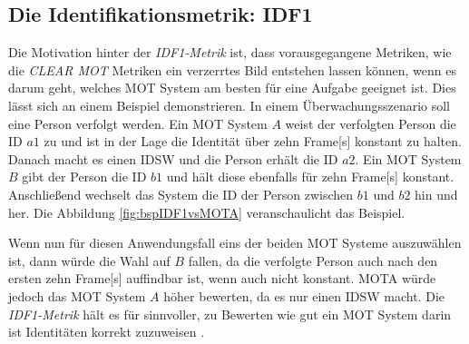 \subsection{Die Identifikationsmetrik: IDF1} \label{sec:MOT F1}
Die Motivation hinter der \textit{\gls{IDF1}-Metrik} ist, dass vorausgegangene Metriken, wie die \textit{\acrshort{CLEAR} \gls{MOT}} Metriken ein verzerrtes Bild entstehen lassen können, wenn es darum geht, welches \gls{MOT} System am besten für eine Aufgabe geeignet ist. Dies lässt sich an einem Beispiel demonstrieren. In einem Überwachungsszenario soll eine Person verfolgt werden. Ein \gls{MOT} System \(A\) weist der verfolgten Person die \acrshort{ID} \(a1\) zu und ist in der Lage die Identität über zehn \gls{Frame}[s] konstant zu halten. Danach macht es einen \gls{IDSW} und die Person erhält die \acrshort{ID} \(a2\). Ein \gls{MOT} System \(B\) gibt der Person die \acrshort{ID} \(b1\) und hält diese ebenfalls für zehn \gls{Frame}[s] konstant. Anschließend wechselt das System die \acrshort{ID} der Person zwischen \(b1\) und \(b2\) hin und her. Die Abbildung \ref{fig:bspIDF1vsMOTA} veranschaulicht das Beispiel.


Wenn nun für diesen Anwendungsfall eins der beiden \gls{MOT} Systeme auszuwählen ist, dann würde die Wahl auf \(B\) fallen, da die verfolgte Person auch nach den ersten zehn \gls{Frame}[s] auffindbar ist, wenn auch nicht konstant. \gls{MOTA} würde jedoch das \gls{MOT} System \(A\) höher bewerten, da es nur einen \gls{IDSW} macht. Die \textit{\gls{IDF1}-Metrik} hält es für sinnvoller, zu Bewerten wie gut ein \gls{MOT} System darin ist Identitäten korrekt zuzuweisen \cite{IDF1}. \par

